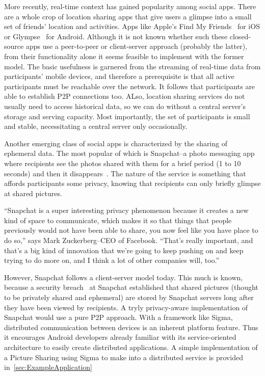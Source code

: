 \documentclass[prodmode]{acmlarge}
\begin{document}
More recently, real-time context has gained popularity among social apps. There are a whole crop of location sharing apps that give users a glimpse into a small set of friends' location and activities. Apps like Apple's Find My Friends~\cite{FindMyFriends} for iOS or Glympse~\cite{Glympse} for Android. Although it is not known whether such these closed-source apps use a peer-to-peer or client-server approach (probably the latter), from their functionality alone it seems feasible to implement with the former model. The basic usefulness is garnered from the streaming of real-time data from participants' mobile devices, and therefore a prerequisite is that all active participants must be reachable over the network. It follows that participants are able to establish P2P connections too. ALso, location sharing services do not usually need to access historical data, so we can do without a central server's storage and serving capacity. Most importantly, the set of participants is small and stable, necessitating a central server only occasionally.

Another emerging class of social apps is characterized by the sharing of ephemeral data. The most popular of which is Snapchat--a photo messaging app where recipients see the photos shared with them for a brief period (1 to 10 seconds) and then it disappears~\cite{Snapchat}. The nature of the service is something that affords participants some privacy, knowing that recipients can only briefly glimpse at shared pictures.

``Snapchat is a super interesting privacy phenomenon because it creates a new kind of space to communicate, which makes it so that things that people previously would not have been able to share, you now feel like you have place to do so,'' says Mark Zuckerberg--CEO of Facebook. ``That's really important, and that's a big kind of innovation that we're going to keep pushing on and keep trying to do more on, and I think a lot of other companies will, too.''~\cite{Zuckerberg}

However, Snapchat follows a client-server model today. This much is known, because a security breach~\cite{SnapchatHack} at Snapchat established that shared pictures (thought to be privately shared and ephemeral) are stored by Snapchat servers long after they have been viewed by recipients. A tryly privacy-aware implementation of Snapchat would use a pure P2P approach. With a framework like Sigma, distributed communication between devices is an inherent platform feature. Thus it encourages Android developers already familiar with its service-oriented architecture to easily create distributed applications. A simple implementation of a Picture Sharing using Sigma to make into a distributed service is provided in~\ref{sec:ExampleApplication}
\end{document}

